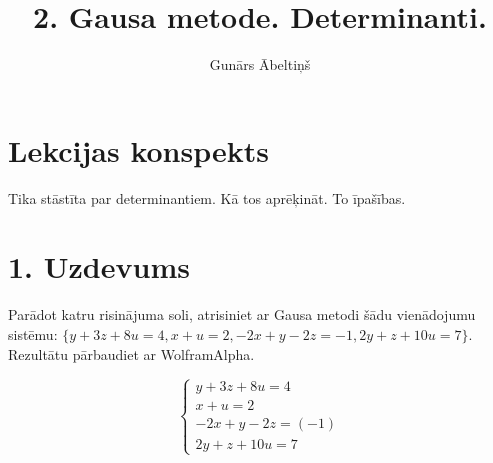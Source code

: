 \documentclass{article}
\title{2. Gausa metode. Determinanti.}
\author{Gunārs Ābeltiņš}
\date{}
\begin{document}
\maketitle

\section*{Lekcijas konspekts}
Tika stāstīta par determinantiem. Kā tos aprēķināt. To īpašības.

\clearpage

\section*{1. Uzdevums}
Parādot katru risinājuma soli, atrisiniet ar Gausa metodi šādu vienādojumu sistēmu:\newline
$\{y+3z+8u=4, x+u=2, -2x+y-2z=-1, 2y+z+10u=7\}$. Rezultātu pārbaudiet ar WolframAlpha.

\begin{equation*}
    \begin{cases}
        y + 3z + 8u = 4\\
        x + u = 2\\
        -2x + y - 2z = (-1)\\
        2y + z + 10u = 7
    \end{cases}
\end{equation*}
\end{document}
